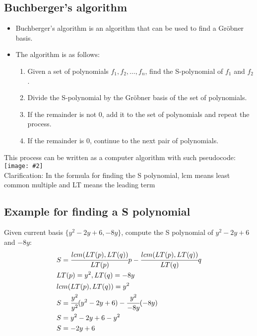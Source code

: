 \documentclass[11pt]{article}
\newcommand{\image}[2]{\texttt{[image: \#2]}}
\newcommand{\myalign}[1]{\begin{align*}#1\end{align*}}
\begin{document}
\subsection*{Buchberger's algorithm}
\begin{itemize}
    \item Buchberger's algorithm is an algorithm that can be used to find a Gröbner basis.
    \item The algorithm is as follows:
    \begin{enumerate}
        \item Given a set of polynomials $f_1, f_2, \dots, f_n$, find the S-polynomial of $f_1$ and $f_2$.
        \item Divide the S-polynomial by the Gröbner basis of the set of polynomials.
        \item If the remainder is not 0, add it to the set of polynomials and repeat the process.
        \item If the remainder is 0, continue to the next pair of polynomials.
    \end{enumerate}
\end{itemize}
This process can be written as a computer algorithm with such pseudocode: \\
\image{0.7}{img2} \\
Clarification:
In the formula for finding the S polynomial, lcm means least common multiple and LT means the leading term \\
\subsection*{Example for finding a S polynomial}
Given current basis $\{y^2-2y+6, -8y\}$, compute the S polynomial of $y^2-2y+6$ and $-8y$: \\
\myalign{
    & S = \cfrac{lcm(LT(p), LT(q))}{LT(p)}p - \cfrac{lcm(LT(p), LT(q))}{LT(q)}q \\
    & LT(p) = y^2, LT(q) = -8y \\
    & lcm(LT(p), LT(q)) = y^2 \\
    & S = \cfrac{y^2}{y^2}(y^2-2y+6) - \cfrac{y^2}{-8y}(-8y) \\
    & S = y^2-2y+6 - y^2 \\
    & S = -2y+6
}
\end{document}
